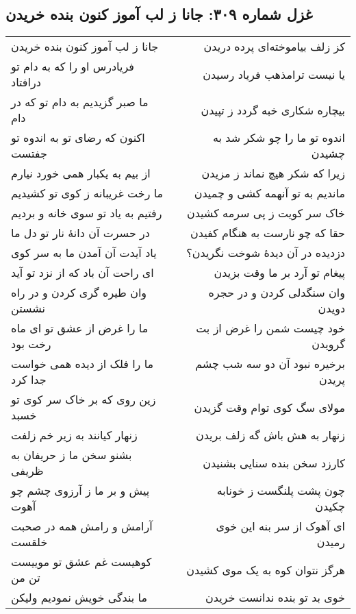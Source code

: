 \begin{center}
\section*{غزل شماره ۳۰۹: جانا ز لب آموز کنون بنده خریدن}
\label{sec:309}
\begin{longtable}{l p{0.5cm} r}
جانا ز لب آموز کنون بنده خریدن
&&
کز زلف بیاموخته‌ای پرده دریدن
\\
فریادرس او را که به دام تو درافتاد
&&
یا نیست ترامذهب فریاد رسیدن
\\
ما صبر گزیدیم به دام تو که در دام
&&
بیچاره شکاری خبه گردد ز تپیدن
\\
اکنون که رضای تو به اندوه تو جفتست
&&
اندوه تو ما را چو شکر شد به چشیدن
\\
از بیم به یکبار همی خورد نیارم
&&
زیرا که شکر هیچ نماند ز مزیدن
\\
ما رخت غریبانه ز کوی تو کشیدیم
&&
ماندیم به تو آنهمه کشی و چمیدن
\\
رفتیم به یاد تو سوی خانه و بردیم
&&
خاک سر کویت ز پی سرمه کشیدن
\\
در حسرت آن دانهٔ نار تو دل ما
&&
حقا که چو نارست به هنگام کفیدن
\\
یاد آیدت آن آمدن ما به سر کوی
&&
دزدیده در آن دیدهٔ شوخت نگریدن؟
\\
ای راحت آن باد که از نزد تو آید
&&
پیغام تو آرد بر ما وقت بزیدن
\\
وان طیره گری کردن و در راه نشستن
&&
وان سنگدلی کردن و در حجره دویدن
\\
ما را غرض از عشق تو ای ماه رخت بود
&&
خود چیست شمن را غرض از بت گرویدن
\\
ما را فلک از دیده همی خواست جدا کرد
&&
برخیره نبود آن دو سه شب چشم پریدن
\\
زین روی که بر خاک سر کوی تو خسبد
&&
مولای سگ کوی توام وقت گزیدن
\\
زنهار کیانند به زیر خم زلفت
&&
زنهار به هش باش گه زلف بریدن
\\
بشنو سخن ما ز حریفان به ظریفی
&&
کارزد سخن بنده سنایی بشنیدن
\\
پیش و بر ما ز آرزوی چشم چو آهوت
&&
چون پشت پلنگست ز خونابه چکیدن
\\
آرامش و رامش همه در صحبت خلقست
&&
ای آهوک از سر بنه این خوی رمیدن
\\
کوهیست غم عشق تو موییست تن من
&&
هرگز نتوان کوه به یک موی کشیدن
\\
ما بندگی خویش نمودیم ولیکن
&&
خوی بد تو بنده ندانست خریدن
\\
\end{longtable}
\end{center}
